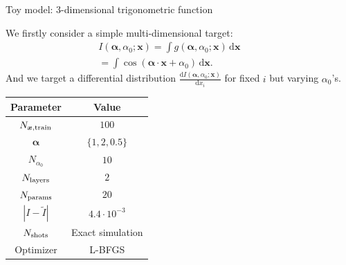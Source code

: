 \documentclass[8pt, xcolor={svgnames}, hyperref={linkcolor=black}]{beamer}
\begin{document}
\begin{frame}{Toy model: $3$-dimensional trigonometric function}
\begin{multicols}{2}

We firstly consider a simple multi-dimensional target:
\begin{equation}
\begin{split}
I(\bm{\alpha}, \alpha_0; \bm{x}) = \int g(\bm{\alpha}, \alpha_0; \bm{x}) \, \text{d}\bm{x}
\qquad \, \\ = \int \cos (\bm{\alpha} \cdot \bm{x} + \alpha_0) \,\text{d}\bm{x}.
\label{eq:cos_int}
\end{split}
\end{equation}
And we target a differential distribution 
$\frac{\text{d}I(\bm{\alpha}, \alpha_0; \bm{x})}{\text{d}x_i}$ for fixed $i$ but varying $\alpha_0$'s. 
\pause


\begin{table}
\small
\begin{tabular}{cc}
\hline \hline
\textbf{Parameter} & \textbf{Value} \\
\hline
$N_{\bm{x}, \rm train}$ & $100$ \\
$\bm{\alpha}$ & $\{1, 2, 0.5\}$ \\
$N_{\alpha_0}$ & $10$ \\
$N_{\rm layers}$ & $2$ \\
$N_{\rm params}$ & $20$ \\ 
$|I - \tilde{I}|$ & $4.4 \cdot 10^{-3}$ \\
$N_{\rm shots}$ & Exact simulation \\
Optimizer & L-BFGS \\
\hline \hline 
\end{tabular}
\end{table}
\end{multicols}
\pause


\end{frame}
\end{document}
